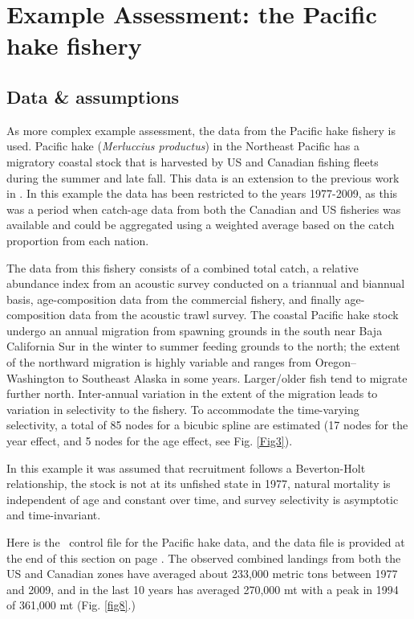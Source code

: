 \section{Example Assessment: the Pacific hake fishery}
\begin{multicols}{2}
\subsection{Data \& assumptions}
As more complex example assessment, the data from the Pacific hake fishery is used.  Pacific hake (\textit{Merluccius productus})  in the Northeast Pacific has a migratory coastal stock that is harvested by US and Canadian fishing fleets during the summer and late fall.  This data is an extension to the previous work in \cite{Martell2008pam}.  In this example the data has been restricted to the years 1977-2009, as this was a period when catch-age data from both the Canadian and US fisheries was available and could be aggregated using a weighted average based on the catch proportion from each nation.

The data from this fishery consists of a combined total catch, a relative abundance index from an acoustic survey conducted on a triannual and biannual basis, age-composition data from the commercial fishery, and finally age-composition data from the acoustic trawl survey. The coastal Pacific hake stock undergo an annual migration from spawning grounds in the south near Baja California Sur in the winter to summer feeding grounds to the north; the extent of the northward migration is highly variable and ranges from Oregon--Washington to Southeast Alaska in some years.  Larger/older fish tend to migrate further north.  Inter-annual variation in the extent of the migration leads to variation in selectivity to the fishery.  To accommodate the time-varying selectivity, a total of 85 nodes for a bicubic spline are estimated (17 nodes for the year effect, and 5 nodes for the age effect, see Fig. \ref{Fig3}).

In this example it was assumed that recruitment follows a Beverton-Holt relationship, the stock is not at its unfished state in 1977, natural mortality is independent of age and constant over time, and survey selectivity is asymptotic and time-invariant.  


Here is the \iscam\ control file for the Pacific hake data, and the data file is provided at the end of this section on page \pageref{HakeDataFile}.  The observed combined landings from both the US and Canadian zones have averaged about 233,000 metric tons between 1977 and 2009, and in the last 10 years has averaged 270,000 mt with a peak in 1994 of 361,000 mt  (Fig. \ref{fig8}.)\\
\tiny
\noindent \hrulefill
\begin{alltt}

\end{alltt}
\hrulefill
\normalsize


\end{multicols}
